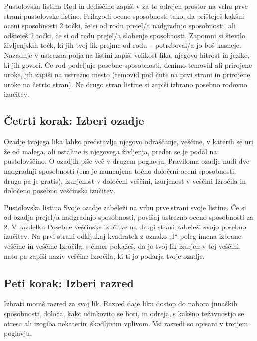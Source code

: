 \begin{rpg-titlebox}{Pustolovska listina}
    Rod in dediščino zapiši v za to odrejen prostor na vrhu prve strani pustolovske listine. Prilagodi ocene sposobnosti tako, da prišteješ kakšni oceni sposobnosti 2 točki, če si od rodu prejel/a nadgradnjo sposobnosti, ali odšteješ 2 točki, če si od rodu prejel/a slabenje sposobnosti. Zapomni si število življenjskih točk, ki jih tvoj lik prejme od rodu -- potreboval/a jo boš kasneje. Nazadnje v ustrezna polja na listini zapiši velikost lika, njegovo hitrost in jezike, ki jih govori. Če rod podeljuje posebne sposobnosti, denimo temovid ali prirojene uroke, jih zapiši na ustrezno mesto (temovid pod čute na prvi strani in prirojene uroke na četrto stran). Na drugo stran listine si zapiši izbrano posebno rodovno izučitev.
\end{rpg-titlebox}

\subsection{Četrti korak: Izberi ozadje}
Ozadje tvojega lika lahko predstavlja njegovo odraščanje, veščine, v katerih se uri že od malega, ali ostaline iz njegovega življenja, preden se je podal na pustolovščino. O ozadjih piše več v drugem poglavju. Praviloma ozadje nudi dve nadgradnji sposobnosti (ena je namenjena točno določeni oceni sposobnosti, druga pa je gratis), izurjenost v določeni veščini, izurjenost v veščini Izročila in določeno posebno veščinsko izučitev.

\begin{rpg-titlebox}{Pustolovska listina}
    Svoje ozadje zabeleži na vrhu prve strani svoje listine. Če si od ozadja prejel/a nadgradnjo sposobnosti, povišaj ustrezno oceno sposobnosti za 2. V razdelku Posebne veščinske izučitve na drugi strani zabeleži svojo posebno izučitev. Na prvi strani odkljukaj kvadratek z oznako „I“ poleg imena izbrane veščine in veščine Izročila, s čimer pokažeš, da je tvoj lik izurjen v tej veščini, nato pa zapiši naziv veščine Izročila, ki ti jo podarja tvoje ozadje.
\end{rpg-titlebox}

\subsection{Peti korak: Izberi razred}
Izbrati moraš razred za svoj lik. Razred daje liku dostop do nabora junaških sposobnosti, določa, kako učinkovito se bori, in odreja, s kakšno težavnostjo se otresa ali izogiba nekaterim škodljivim vplivom. Vsi razredi so opisani v tretjem poglavju.

